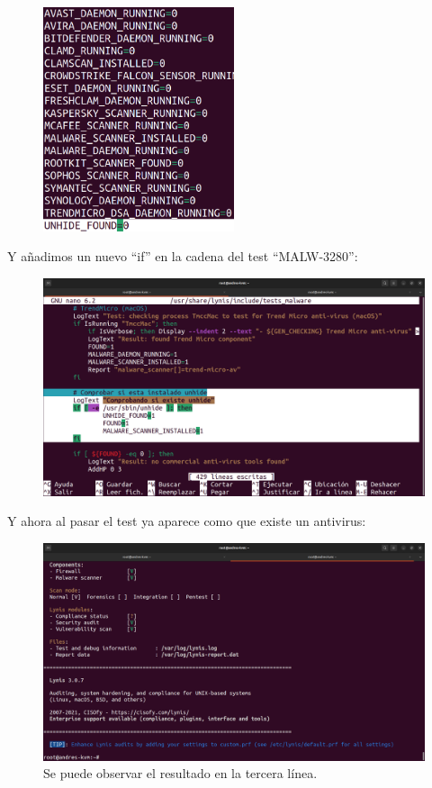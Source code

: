 \documentclass{article}
\begin{document}
\begin{figure}[H]
    \centering
    \includegraphics[width=0.5\textwidth]{imagenes/macro.png}
\end{figure}

Y añadimos un nuevo ``if'' en la cadena del test ``MALW-3280'':

\begin{figure}[H]
    \includegraphics[width=\textwidth]{imagenes/unhidetest.png}
\end{figure}

Y ahora al pasar el test ya aparece como que existe un antivirus:

\begin{figure}[H]
    \includegraphics[width=\textwidth]{imagenes/lynisok.png}
    \caption{Se puede observar el resultado en la tercera línea.}
\end{figure}
\end{document}
